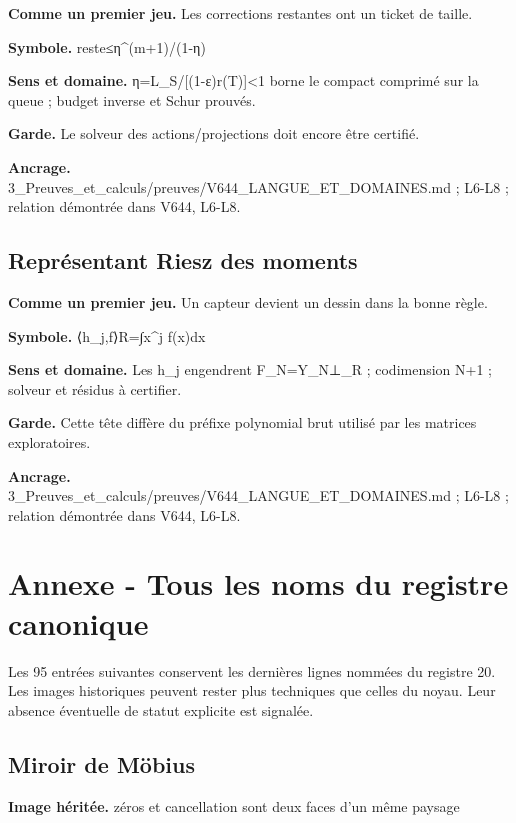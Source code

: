\documentclass[
  9pt,
  a4paper,
]{article}
\begin{document}
\textbf{Comme un premier jeu.} Les corrections restantes ont un ticket
de taille.

\textbf{Symbole.} reste≤η\^{}(m+1)/(1-η)

\textbf{Sens et domaine.} η=L\_S/{[}(1-ε)r(T){]}\textless1 borne le
compact comprimé sur la queue ; budget inverse et Schur prouvés.

\textbf{Garde.} Le solveur des actions/projections doit encore être
certifié.

\textbf{Ancrage.}
3\_Preuves\_et\_calculs/preuves/V644\_LANGUE\_ET\_DOMAINES.md ; L6-L8 ;
relation démontrée dans V644, L6-L8.

\hypertarget{repruxe9sentant-riesz-des-moments}{%
\subsection{Représentant Riesz des
moments}\label{repruxe9sentant-riesz-des-moments}}

\textbf{Comme un premier jeu.} Un capteur devient un dessin dans la
bonne règle.

\textbf{Symbole.} ⟨h\_j,f⟩R=∫x\^{}j f(x)dx

\textbf{Sens et domaine.} Les h\_j engendrent F\_N=Y\_N⊥\_R ;
codimension N+1 ; solveur et résidus à certifier.

\textbf{Garde.} Cette tête diffère du préfixe polynomial brut utilisé
par les matrices exploratoires.

\textbf{Ancrage.}
3\_Preuves\_et\_calculs/preuves/V644\_LANGUE\_ET\_DOMAINES.md ; L6-L8 ;
relation démontrée dans V644, L6-L8.

\hypertarget{annexe---tous-les-noms-du-registre-canonique}{%
\section{Annexe - Tous les noms du registre
canonique}\label{annexe---tous-les-noms-du-registre-canonique}}

Les 95 entrées suivantes conservent les dernières lignes nommées du
registre 20. Les images historiques peuvent rester plus techniques que
celles du noyau. Leur absence éventuelle de statut explicite est
signalée.

\hypertarget{miroir-de-muxf6bius}{%
\subsection{Miroir de Möbius}\label{miroir-de-muxf6bius}}

\textbf{Image héritée.} zéros et cancellation sont deux faces d'un même
paysage
\end{document}
